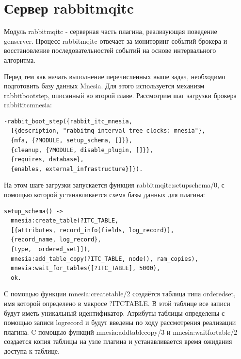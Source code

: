 \section{Сервер rabbitmq\underline{\hspace{0.25cm}}itc}
Модуль rabbitmq\underline{\hspace{0.25cm}}itc - серверная часть плагина, реализующая поведение gen\underline{\hspace{0.25cm}}server. Процесс rabbitmq\underline{\hspace{0.25cm}}itc отвечает за мониторинг событий брокера и восстановление последовательностей событий на основе интервального алгоритма.\par
Перед тем как начать выполнение перечисленных выше задач, необходимо подготовить базу данных Mnesia. Для этого используется механизм rabbit\underline{\hspace{0.25cm}}boot\underline{\hspace{0.25cm}}step, описанный во второй главе. Рассмотрим шаг загрузки брокера rabbit\underline{\hspace{0.25cm}}itc\underline{\hspace{0.25cm}}mnesia:
\begin{lstlisting}
-rabbit_boot_step({rabbit_itc_mnesia,
  [{description, "rabbitmq interval tree clocks: mnesia"},
  {mfa, {?MODULE, setup_schema, []}},
  {cleanup, {?MODULE, disable_plugin, []}},
  {requires, database},
  {enables, external_infrastructure}]}).
\end{lstlisting}
На этом шаге загрузки запускается функция rabbitmq\underline{\hspace{0.25cm}}itc:setup\underline{\hspace{0.25cm}}schema/0, с помощью которой устанавливается схема базы данных для плагина: 
\begin{lstlisting}
setup_schema() ->
  mnesia:create_table(?ITC_TABLE,
  [{attributes, record_info(fields, log_record)},
  {record_name, log_record},
  {type,  ordered_set}]),
  mnesia:add_table_copy(?ITC_TABLE, node(), ram_copies),
  mnesia:wait_for_tables([?ITC_TABLE], 5000),
  ok.
\end{lstlisting}
С помощью функции mnesia:create\underline{\hspace{0.25cm}}table/2 создаётся таблица типа  ordered\underline{\hspace{0.25cm}}set, имя которой определено в макросе ?ITC\underline{\hspace{0.25cm}}TABLE. В этой таблице все записи будут иметь уникальный идентификатор. Атрибуты таблицы определены с помощью записи log\underline{\hspace{0.25cm}}record и будут введены по ходу рассмотрения реализации плагина. C помощью функций mnesia:add\underline{\hspace{0.25cm}}table\underline{\hspace{0.25cm}}copy/3 и  mnesia:wait\underline{\hspace{0.25cm}}for\underline{\hspace{0.25cm}}table/2 создается копия таблицы на узле плагина и устанавливается время ожидания доступа к таблице.\par 
